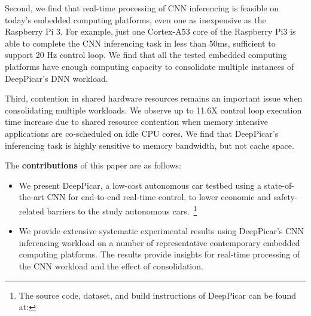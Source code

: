 Second, we find that real-time processing of CNN inferencing is
feasible on today's embedded computing platforms, even one   
as inexpensive as the Raspberry Pi 3. For example, just one Cortex-A53
core of the Raspberry Pi3 is able to complete the CNN inferencing task
in less than 50ms, sufficient to support 20 Hz control loop. 
We find that all the tested embedded computing platforms have 
enough computing capacity to consolidate multiple instances of
DeepPicar's DNN workload.

Third, contention in shared hardware resources remains an important
issue when consolidating multiple workloads. 
We observe up to 11.6X control
loop execution time increase due to shared resource contention when
memory intensive  applications are co-scheduled on idle CPU cores.
We find that DeepPicar's inferencing task is highly
sensitive to memory bandwidth, but not cache space.


The {\bf contributions} of this paper are as follows:
\begin{itemize}
  \item We present DeepPicar, a low-cost autonomous car testbed using
    a state-of-the-art CNN for end-to-end real-time control, to lower
    economic and safety-related barriers to the study autonomous
    cars.~\footnote{The source code, dataset, and build instructions
      of DeepPicar can be found at:}  
    
  \item We provide extensive systematic experimental results using
    DeepPicar's CNN inferencing workload on a number of representative
    contemporary embedded computing platforms. The results provide
    insights for real-time processing of the CNN workload and the
    effect of consolidation.
    
\end{itemize}

